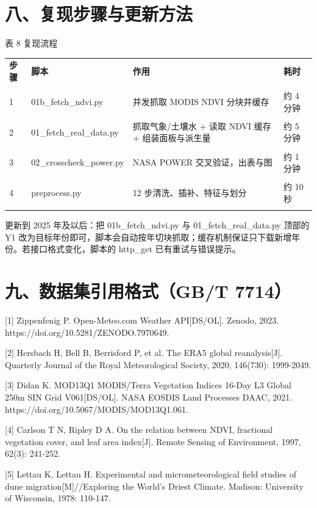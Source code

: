 \documentclass[11pt,a4paper]{ctexart}
\begin{document}
\section*{八、复现步骤与更新方法}
表 8  复现流程


\begin{table}[H]\centering\small\setlength{\parskip}{2pt}
\begin{tabularx}{\textwidth}{|X|X|X|X|}
\toprule
\textbf{步骤} & \textbf{脚本} & \textbf{作用} & \textbf{耗时} \\\\
\midrule
1 & 01b\_fetch\_ndvi.py & 并发抓取 MODIS NDVI 分块并缓存 & 约 4 分钟 \\\\
2 & 01\_fetch\_real\_data.py & 抓取气象/土壤水 + 读取 NDVI 缓存 + 组装面板与派生量 & 约 5 分钟 \\\\
3 & 02\_crosscheck\_power.py & NASA POWER 交叉验证，出表与图 & 约 1 分钟 \\\\
4 & preprocess.py & 12 步清洗、插补、特征与划分 & 约 10 秒 \\\\
\bottomrule
\end{tabularx}
\end{table}
更新到 2025 年及以后：把 01b\_fetch\_ndvi.py 与 01\_fetch\_real\_data.py 顶部的 Y1 改为目标年份即可，脚本会自动按年切块抓取；缓存机制保证只下载新增年份。若接口格式变化，脚本的 http\_get 已有重试与错误提示。


\section*{九、数据集引用格式（GB/T 7714）}
[1] Zippenfenig P. Open-Meteo.com Weather API[DS/OL]. Zenodo, 2023. https://doi.org/10.5281/ZENODO.7970649.

[2] Hersbach H, Bell B, Berrisford P, et al. The ERA5 global reanalysis[J]. Quarterly Journal of the Royal Meteorological Society, 2020, 146(730): 1999-2049.

[3] Didan K. MOD13Q1 MODIS/Terra Vegetation Indices 16-Day L3 Global 250m SIN Grid V061[DS/OL]. NASA EOSDIS Land Processes DAAC, 2021. https://doi.org/10.5067/MODIS/MOD13Q1.061.

[4] Carlson T N, Ripley D A. On the relation between NDVI, fractional vegetation cover, and leaf area index[J]. Remote Sensing of Environment, 1997, 62(3): 241-252.

[5] Lettau K, Lettau H. Experimental and micrometeorological field studies of dune migration[M]//Exploring the World's Driest Climate. Madison: University of Wisconsin, 1978: 110-147.
\end{document}
